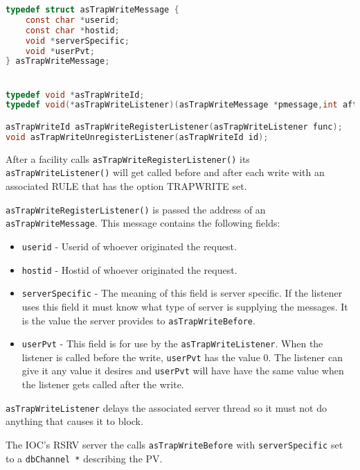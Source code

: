 \begin{lstlisting}[language=C]
typedef struct asTrapWriteMessage {
    const char *userid;
    const char *hostid;
    void *serverSpecific;
    void *userPvt;
} asTrapWriteMessage;


typedef void *asTrapWriteId;
typedef void(*asTrapWriteListener)(asTrapWriteMessage *pmessage,int after);

asTrapWriteId asTrapWriteRegisterListener(asTrapWriteListener func);
void asTrapWriteUnregisterListener(asTrapWriteId id);
\end{lstlisting}

After a facility calls \verb|asTrapWriteRegisterListener()| its \verb|asTrapWriteListener()| will get called before 
and after each write with an associated RULE that has the option TRAPWRITE  set.

\verb|asTrapWriteRegisterListener()| is passed the address of an \verb|asTrapWriteMessage|. This message contains 
the following fields:

\begin{itemize}
\item  \verb|userid| - Userid of whoever originated the request.

\item  \verb|hostid| - Hostid of whoever originated the request.

\item \verb|serverSpecific| - The meaning of this field is server specific.
If the listener uses this field it must know what type of server is supplying the messages.
It is the value the server provides to \verb|asTrapWriteBefore|.

\item \verb|userPvt| - This field is for use by the \verb|asTrapWriteListener|.
When the listener is called before the write, \verb|userPvt| has the value 0.
The listener can give it any value it desires and \verb|userPvt| will have have the same value when the listener gets called after the write.
\end{itemize}

\verb|asTrapWriteListener| delays the associated server thread so it must not do anything that causes it to block.

The IOC's RSRV server the calls \verb|asTrapWriteBefore| with \verb|serverSpecific| set to a \verb|dbChannel *| describing the PV.

